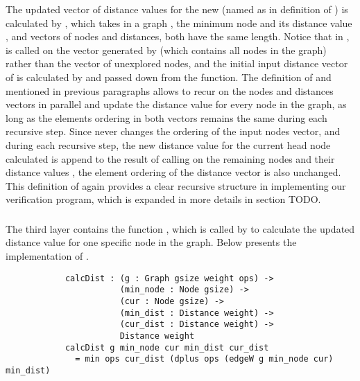 The updated vector of distance values for the new (named as  in definition of ) is calculated by , which takes in a graph , the minimum node  and its distance value , and vectors of nodes and distances, both have the same length. Notice that in ,  is called on the vector generated by  (which contains all nodes in the graph) rather than the vector of unexplored nodes, and the initial input distance vector of  is calculated by  and passed down from the  function. The definition of  and  mentioned in previous paragraphs allows  to recur on the nodes and distances vectors in parallel and update the distance value for every node in the graph, as long as the elements ordering in both vectors remains the same during each recursive step. Since  never changes the ordering of the input nodes vector, and during each recursive step, the new distance value for the current head node  calculated is append to the result of calling  on the remaining nodes  and their distance values , the element ordering of the distance vector is also unchanged. This definition of  again provides a clear recursive structure in implementing our verification program, which is expanded in more details in section TODO. %
\\

\subsubsection{} \label{third_layer}
The third layer contains the function , which is called by  to calculate the updated distance value for one specific node in the graph. Below presents the implementation of .
\begin{lstlisting}
			calcDist : (g : Graph gsize weight ops) ->
			           (min_node : Node gsize) ->
			           (cur : Node gsize) ->
			           (min_dist : Distance weight) ->
			           (cur_dist : Distance weight) ->
			           Distance weight
			calcDist g min_node cur min_dist cur_dist
			  = min ops cur_dist (dplus ops (edgeW g min_node cur) min_dist)
\end{lstlisting}

